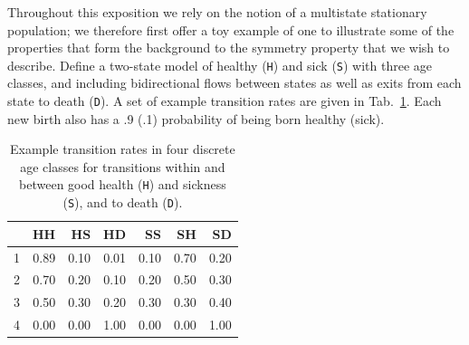 \documentclass[12pt,oneside,a4paper]{article}
\theoremstyle{definition}
\newcommand{\vb}[1]{\texttt{#1}}
\begin{document}
Throughout this exposition we rely on the notion of a multistate stationary population; we therefore first offer a toy example of one to illustrate some of the properties that form the background to the symmetry property that we wish to describe. Define a two-state model of healthy (\vb{H}) and sick (\vb{S}) with three age classes, and including bidirectional flows between states as well as exits from each state to death (\vb{D}). A set of example transition rates are given in Tab.~\ref{tab:toy}. Each new birth also has a .9 (.1) probability of being born healthy (sick). 


\begin{table}[ht]
\centering
 \caption{Example transition rates in four discrete age classes for transitions within and between good health (\vb{H}) and sickness (\vb{S}), and to death (\vb{D}).}
 \label{tab:toy}
\begin{tabular}{rrrrrrr}
  \hline
 & HH & HS & HD & SS & SH & SD \\ 
  \hline
1 & 0.89 & 0.10 & 0.01 & 0.10 & 0.70 & 0.20 \\ 
  2 & 0.70 & 0.20 & 0.10 & 0.20 & 0.50 & 0.30 \\ 
  3 & 0.50 & 0.30 & 0.20 & 0.30 & 0.30 & 0.40 \\ 
  4 & 0.00 & 0.00 & 1.00 & 0.00 & 0.00 & 1.00 \\ 
   \hline
\end{tabular}
\end{table}
\end{document}
